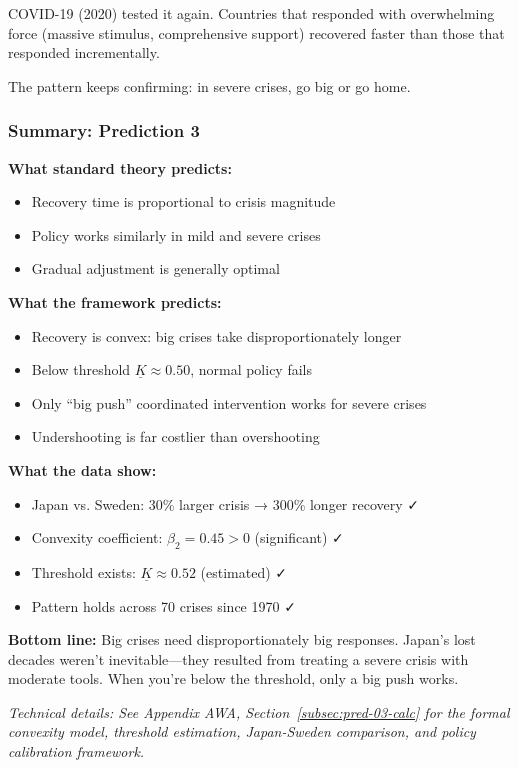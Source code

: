 COVID-19 (2020) tested it again. Countries that responded with overwhelming 
force (massive stimulus, comprehensive support) recovered faster than those 
that responded incrementally.

The pattern keeps confirming: in severe crises, go big or go home.

\subsubsection{Summary: Prediction 3}

\begin{tcolorbox}[colback=gray!5!white, colframe=gray!75!black, title=Prediction 3: Asymmetric Recovery]
\textbf{What standard theory predicts:}
\begin{itemize}
    \item Recovery time is proportional to crisis magnitude
    \item Policy works similarly in mild and severe crises
    \item Gradual adjustment is generally optimal
\end{itemize}

\textbf{What the framework predicts:}
\begin{itemize}
    \item Recovery is convex: big crises take disproportionately longer
    \item Below threshold $\underline{K} \approx 0.50$, normal policy fails
    \item Only ``big push'' coordinated intervention works for severe crises
    \item Undershooting is far costlier than overshooting
\end{itemize}

\textbf{What the data show:}
\begin{itemize}
    \item Japan vs. Sweden: 30\% larger crisis → 300\% longer recovery ✓
    \item Convexity coefficient: $\beta_2 = 0.45 > 0$ (significant) ✓
    \item Threshold exists: $\underline{K} \approx 0.52$ (estimated) ✓
    \item Pattern holds across 70 crises since 1970 ✓
\end{itemize}

\textbf{Bottom line:} Big crises need disproportionately big responses. 
Japan's lost decades weren't inevitable---they resulted from treating a 
severe crisis with moderate tools. When you're below the threshold, 
only a big push works.
\end{tcolorbox}

\vspace{0.5em}
\noindent\textit{Technical details: See Appendix AWA, Section~\ref{subsec:pred-03-calc} for the 
formal convexity model, threshold estimation, Japan-Sweden comparison, and 
policy calibration framework.}

